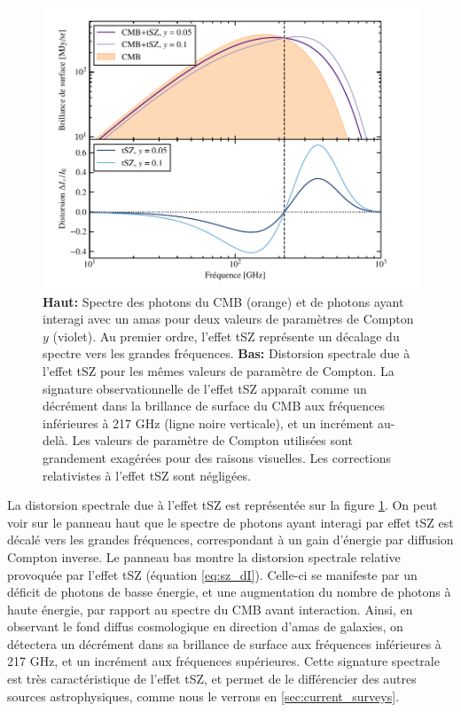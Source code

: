 \begin{figure}[t]
    \centering
    \includegraphics[width=.8\linewidth]{Figures/Chap_amas/CMB_SZ_spectrum.pdf}
    \caption{
        \textbf{Haut:} Spectre des photons du CMB (orange) et de photons ayant interagi avec un amas pour deux valeurs de paramètres de Compton $y$ (violet).
        Au premier ordre, l'effet tSZ représente un décalage du spectre vers les grandes fréquences.
        \textbf{Bas:} Distorsion spectrale due à l'effet tSZ pour les mêmes valeurs de paramètre de Compton.
        La signature observationnelle de l'effet tSZ apparaît comme un décrément dans la brillance de surface du CMB aux fréquences inférieures à 217 GHz (ligne noire verticale), et un incrément au-delà.
        Les valeurs de paramètre de Compton utilisées sont grandement exagérées pour des raisons visuelles.
        Les corrections relativistes à l'effet tSZ sont négligées.
    }
    \label{fig:tsz_spec}
\end{figure}

La distorsion spectrale due à l'effet tSZ est représentée sur la figure \ref{fig:tsz_spec}.
On peut voir sur le panneau haut que le spectre de photons ayant interagi par effet tSZ est décalé vers les grandes fréquences, correspondant à un gain d'énergie par diffusion Compton inverse.
Le panneau bas montre la distorsion spectrale relative provoquée par l'effet tSZ (équation \ref{eq:sz_dI}).
Celle-ci se manifeste par un déficit de photons de basse énergie, et une augmentation du nombre de photons à haute énergie, par rapport au spectre du CMB avant interaction.
Ainsi, en observant le fond diffus cosmologique en direction d'amas de galaxies, on détectera un décrément dans sa brillance de surface aux fréquences inférieures à 217 GHz, et un incrément aux fréquences supérieures.
Cette signature spectrale est très caractéristique de l'effet tSZ, et permet de le différencier des autres sources astrophysiques, comme nous le verrons en \ref{sec:current_surveys}.

